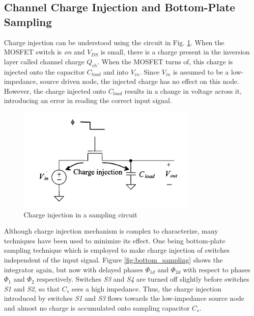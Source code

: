 \subsection{Channel Charge Injection and Bottom-Plate Sampling}
Charge injection can be understood using the circuit in Fig. \ref{fig:charge_injection}. When the MOSFET switch is \textit{on} and $V_{DS}$ is small, there is a charge present in the inversion layer called channel charge $Q_{ch}$. When the MOSFET turns of, this charge is injected onto the capacitor $C_{load}$ and into $V_{in}$. Since $V_{in}$ is assumed to be a low-impedance, source driven node, the injected charge has no effect on this node. However, the charge injected onto $C_{load}$ results in a change in voltage across it, introducing an error in reading the correct input signal. 

\begin{figure}[H]
\centering
\includegraphics[scale=0.9]{images/charge_injection.png}
\caption{Charge injection in a sampling circuit}
\label{fig:charge_injection}
\end{figure}

Although charge injection mechanism is complex to characterize, many techniques have been used to minimize its effect. One being bottom-plate sampling technique\cite{Barker} which is employed to make charge injection of switches independent of the input signal. Figure \ref{fig:bottom_sampling} shows the integrator again, but now with delayed phases $\Phi_{1d}$ and $\Phi_{2d}$ with respect to phases $\Phi_1$ and $\Phi_2$ respectively. Switches \textit{S3} and \textit{S4} are turned off slightly before switches \textit{S1} and \textit{S2}, so that $C_s$ sees a high impedance. Thus, the charge injection introduced by switches \textit{S1} and \textit{S3} flows towards the low-impedance source node and almost no charge is accumulated onto sampling capacitor $C_s$.

